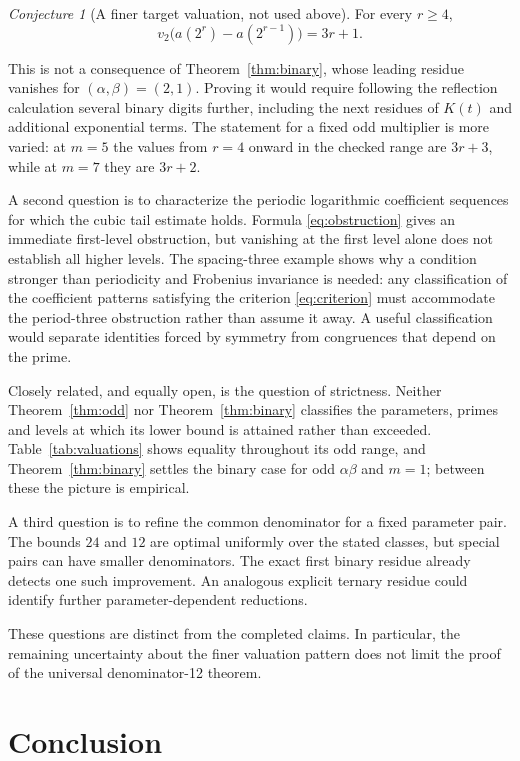 \documentclass[11pt,a4paper]{article}
\numberwithin{equation}{section}
\theoremstyle{definition}
\theoremstyle{remark}
\newtheorem{conjecture}[theorem]{Conjecture}
\begin{document}
\begin{conjecture}[A finer target valuation, not used above]\label{conj:finer}
For every $r\ge4$,
\[
 v_2\bigl(a(2^r)-a(2^{r-1})\bigr)=3r+1.
\]
\end{conjecture}

This is not a consequence of Theorem~\ref{thm:binary}, whose leading residue
vanishes for $(\alpha,\beta)=(2,1)$. Proving it would require following the
reflection calculation several binary digits further, including the next
residues of $K(t)$ and additional exponential terms. The statement for a
fixed odd multiplier is more varied: at $m=5$ the values from $r=4$ onward
in the checked range are $3r+3$, while at $m=7$ they are $3r+2$.

A second question is to characterize the periodic logarithmic coefficient
sequences for which the cubic tail estimate holds. Formula
\eqref{eq:obstruction} gives an immediate first-level obstruction, but
vanishing at the first level alone does not establish all higher levels.
The spacing-three example shows why a condition stronger than periodicity
and Frobenius invariance is needed: any classification of the coefficient
patterns satisfying the criterion \eqref{eq:criterion} must accommodate the
period-three obstruction rather than assume it away. A useful classification
would separate identities forced by symmetry from congruences that depend on
the prime.

Closely related, and equally open, is the question of strictness. Neither
Theorem~\ref{thm:odd} nor Theorem~\ref{thm:binary} classifies the parameters,
primes and levels at which its lower bound is attained rather than exceeded.
Table~\ref{tab:valuations} shows equality throughout its odd range, and
Theorem~\ref{thm:binary} settles the binary case for odd $\alpha\beta$ and
$m=1$; between these the picture is empirical.

A third question is to refine the common denominator for a fixed parameter
pair. The bounds $24$ and $12$ are optimal uniformly over the stated classes,
but special pairs can have smaller denominators. The exact first binary
residue already detects one such improvement. An analogous explicit
ternary residue could identify further parameter-dependent reductions.

These questions are distinct from the completed claims. In particular,
the remaining uncertainty about the finer valuation pattern does not limit
the proof of the universal denominator-12 theorem.

\section{Conclusion}
\end{document}
